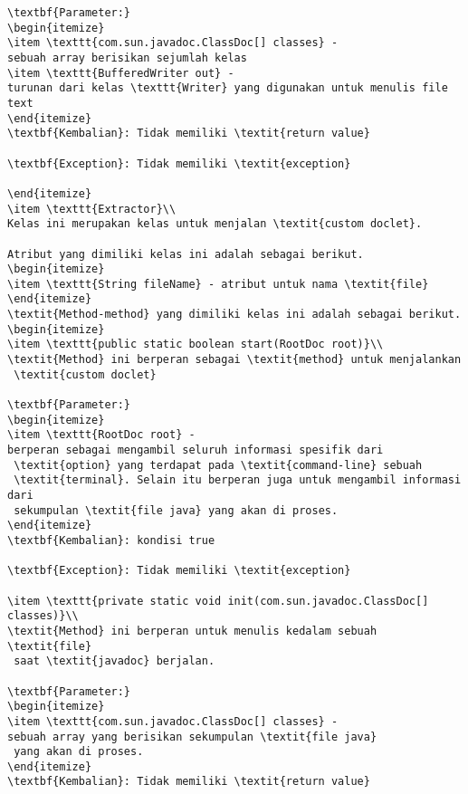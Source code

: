 \begin{lstlisting}[caption=Hasil Implementasi]
\textbf{Parameter:}
\begin{itemize}
\item \texttt{com.sun.javadoc.ClassDoc[] classes} - 
sebuah array berisikan sejumlah kelas
\item \texttt{BufferedWriter out} - 
turunan dari kelas \texttt{Writer} yang digunakan untuk menulis file text
\end{itemize}
\textbf{Kembalian}: Tidak memiliki \textit{return value}

\textbf{Exception}: Tidak memiliki \textit{exception}

\end{itemize}
\item \texttt{Extractor}\\ 
Kelas ini merupakan kelas untuk menjalan \textit{custom doclet}.

Atribut yang dimiliki kelas ini adalah sebagai berikut.
\begin{itemize}
\item \texttt{String fileName} - atribut untuk nama \textit{file}
\end{itemize}
\textit{Method-method} yang dimiliki kelas ini adalah sebagai berikut.
\begin{itemize}
\item \texttt{public static boolean start(RootDoc root)}\\ 
\textit{Method} ini berperan sebagai \textit{method} untuk menjalankan
 \textit{custom doclet}

\textbf{Parameter:}
\begin{itemize}
\item \texttt{RootDoc root} - 
berperan sebagai mengambil seluruh informasi spesifik dari
 \textit{option} yang terdapat pada \textit{command-line} sebuah
 \textit{terminal}. Selain itu berperan juga untuk mengambil informasi dari
 sekumpulan \textit{file java} yang akan di proses.
\end{itemize}
\textbf{Kembalian}: kondisi true

\textbf{Exception}: Tidak memiliki \textit{exception}

\item \texttt{private static void init(com.sun.javadoc.ClassDoc[] classes)}\\ 
\textit{Method} ini berperan untuk menulis kedalam sebuah \textit{file}
 saat \textit{javadoc} berjalan.

\textbf{Parameter:}
\begin{itemize}
\item \texttt{com.sun.javadoc.ClassDoc[] classes} - 
sebuah array yang berisikan sekumpulan \textit{file java}
 yang akan di proses.
\end{itemize}
\textbf{Kembalian}: Tidak memiliki \textit{return value}


\end{lstlisting}
